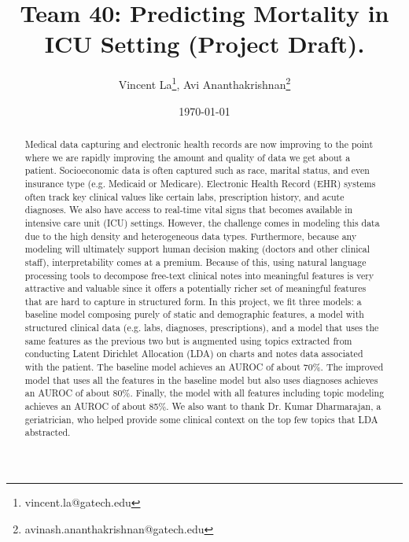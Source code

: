 \documentclass[12pt, final]{article}
\renewcommand{\thefootnote}{$\star$}
\begin{document}
\title{Team 40: Predicting Mortality in ICU Setting (Project Draft).}

\date{\today}

\renewcommand{\thefootnote}{$\dag$}
\author{Vincent La\footnote{vincent.la@gatech.edu}, Avi Ananthakrishnan\footnote{avinash.ananthakrishnan@gatech.edu}}

\maketitle

\begin{abstract}
Medical data capturing and electronic health records are now improving to the point where we are rapidly improving the amount and quality of data we get about a patient. Socioeconomic data is often captured such as race, marital status, and even insurance type (e.g. Medicaid or Medicare). Electronic Health Record (EHR) systems often track key clinical values like certain labs, prescription history, and acute diagnoses. We also have access to real-time vital signs that becomes available in intensive care unit (ICU) settings. However, the challenge comes in modeling this data due to the high density and heterogeneous data types. Furthermore, because any modeling will ultimately support human decision making (doctors and other clinical staff), interpretability comes at a premium. Because of this, using natural language processing tools to decompose free-text clinical notes into meaningful features is very attractive and valuable since it offers a potentially richer set of meaningful features that are hard to capture in structured form. In this project, we fit three models: a baseline model composing purely of static and demographic features, a model with structured clinical data (e.g. labs, diagnoses, prescriptions), and a model that uses the same features as the previous two but is augmented using topics extracted from conducting Latent Dirichlet Allocation (LDA) on charts and notes data associated with the patient. The baseline model achieves an AUROC of about 70\%. The improved model that uses all the features in the baseline model but also uses diagnoses achieves an AUROC of about 80\%. Finally, the model with all features including topic modeling achieves an AUROC of about 85\%. We also want to thank Dr. Kumar Dharmarajan, a geriatrician, who helped provide some clinical context on the top few topics that LDA abstracted.
\end{abstract} 

\newpage
\renewcommand{\thefootnote}{\number\value{footnote}} 
\end{document}

